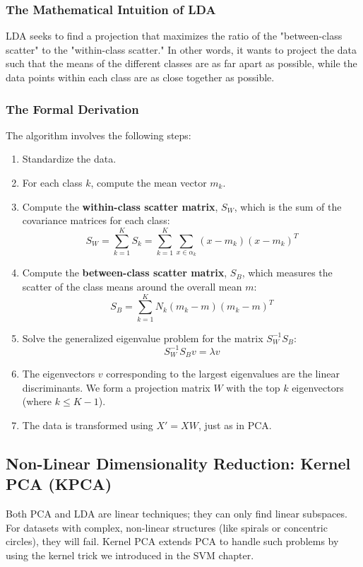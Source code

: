 \subsubsection*{The Mathematical Intuition of LDA}
LDA seeks to find a projection that maximizes the ratio of the "between-class scatter" to the "within-class scatter." In other words, it wants to project the data such that the means of the different classes are as far apart as possible, while the data points within each class are as close together as possible.

\subsubsection*{The Formal Derivation}
The algorithm involves the following steps:
\begin{enumerate}
    \item Standardize the data.
    \item For each class $k$, compute the mean vector $m_k$.
    \item Compute the \textbf{within-class scatter matrix}, $S_W$, which is the sum of the covariance matrices for each class:
    $$ S_W = \sum_{k=1}^{K} S_k = \sum_{k=1}^{K} \sum_{x \in \alpha_k} (x - m_k)(x - m_k)^T $$
    \item Compute the \textbf{between-class scatter matrix}, $S_B$, which measures the scatter of the class means around the overall mean $m$:
    $$ S_B = \sum_{k=1}^{K} N_k (m_k - m)(m_k - m)^T $$
    \item Solve the generalized eigenvalue problem for the matrix $S_W^{-1}S_B$:
    $$ S_W^{-1}S_B v = \lambda v $$
    \item The eigenvectors $v$ corresponding to the largest eigenvalues are the linear discriminants. We form a projection matrix $W$ with the top $k$ eigenvectors (where $k \le K-1$).
    \item The data is transformed using $X' = XW$, just as in PCA.
\end{enumerate}

\subsection*{Non-Linear Dimensionality Reduction: Kernel PCA (KPCA)}
Both PCA and LDA are linear techniques; they can only find linear subspaces. For datasets with complex, non-linear structures (like spirals or concentric circles), they will fail. Kernel PCA extends PCA to handle such problems by using the kernel trick we introduced in the SVM chapter.

